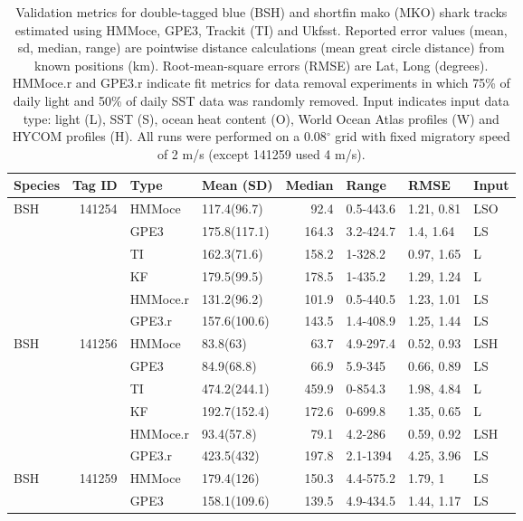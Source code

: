 \begin{table}[h!] %
\caption[Validation metrics for geolocation methods]{Validation metrics for double-tagged
blue (BSH) and shortfin mako (MKO) shark tracks estimated using HMMoce,
GPE3, Trackit (TI) and Ukfsst. Reported error values (mean, sd, median,
range) are pointwise distance calculations (mean great circle distance)
from known positions (km). Root-mean-square errors (RMSE) are Lat, Long
(degrees). HMMoce.r and GPE3.r indicate fit metrics for data removal
experiments in which 75\% of daily light and 50\% of daily SST data was
randomly removed. Input indicates input data type: light (L), SST (S),
ocean heat content (O), World Ocean Atlas profiles (W) and HYCOM
profiles (H). All runs were performed on a 0.08$^{\circ}$ grid with fixed
migratory speed of 2 m/s (except 141259 used 4 m/s).}
\label{tab:c2t2}
\centering
\begin{tabular}[t]{lrllrlll}
\toprule
\textbf{Species} & \textbf{Tag ID} & \textbf{Type} & \textbf{Mean (SD)} & \textbf{Median} & \textbf{Range} & \textbf{RMSE} & \textbf{Input}\\
\midrule
BSH & 141254 & HMMoce & 117.4(96.7) & 92.4 & 0.5-443.6 & 1.21, 0.81 & LSO\\
 &  & GPE3 & 175.8(117.1) & 164.3 & 3.2-424.7 & 1.4, 1.64 & LS\\
 &  & TI & 162.3(71.6) & 158.2 & 1-328.2 & 0.97, 1.65 & L\\
 &  & KF & 179.5(99.5) & 178.5 & 1-435.2 & 1.29, 1.24 & L\\
 &  & HMMoce.r & 131.2(96.2) & 101.9 & 0.5-440.5 & 1.23, 1.01 & LS\\
 &  & GPE3.r & 157.6(100.6) & 143.5 & 1.4-408.9 & 1.25, 1.44 & LS\\
\addlinespace
BSH & 141256 & HMMoce & 83.8(63) & 63.7 & 4.9-297.4 & 0.52, 0.93 & LSH\\
 &  & GPE3 & 84.9(68.8) & 66.9 & 5.9-345 & 0.66, 0.89 & LS\\
 &  & TI & 474.2(244.1) & 459.9 & 0-854.3 & 1.98, 4.84 & L\\
 &  & KF & 192.7(152.4) & 172.6 & 0-699.8 & 1.35, 0.65 & L\\
 &  & HMMoce.r & 93.4(57.8) & 79.1 & 4.2-286 & 0.59, 0.92 & LSH\\
 &  & GPE3.r & 423.5(432) & 197.8 & 2.1-1394 & 4.25, 3.96 & LS\\
\addlinespace
BSH & 141259 & HMMoce & 179.4(126) & 150.3 & 4.4-575.2 & 1.79, 1 & LS\\
 &  & GPE3 & 158.1(109.6) & 139.5 & 4.9-434.5 & 1.44, 1.17 & LS\\

\end{tabular}
\end{table}
